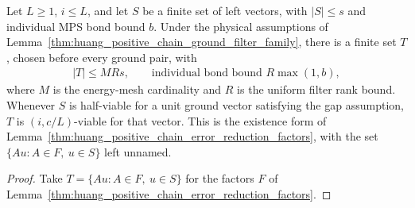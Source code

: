 \begin{lemma}
    \label{thm:huang_positive_chain_viable_filter}
    \leanok
    Let $L\ge1$, $i\le L$, and let $S$ be a finite set of left vectors,
    with $|S|\le s$ and individual MPS bond bound $b$. Under the physical
    assumptions of Lemma~\ref{thm:huang_positive_chain_ground_filter_family},
    there is a finite set $T$, chosen before every ground pair, with
    \begin{align*}
        |T|\le MR s,\qquad
        \text{individual bond bound }R\max(1,b),
    \end{align*}
    where $M$ is the energy-mesh cardinality and $R$ is the uniform filter
    rank bound. Whenever $S$ is half-viable for a unit ground vector
    satisfying the gap assumption, $T$ is $(i,c/L)$-viable for that vector.
    This is the existence form of
    Lemma~\ref{thm:huang_positive_chain_error_reduction_factors}, with the
    set $\{Au : A\in F,\ u\in S\}$ left unnamed.
\end{lemma}
\begin{proof}
    \leanok
    Take $T=\{Au : A\in F,\ u\in S\}$ for the factors $F$ of
    Lemma~\ref{thm:huang_positive_chain_error_reduction_factors}.
\end{proof}
